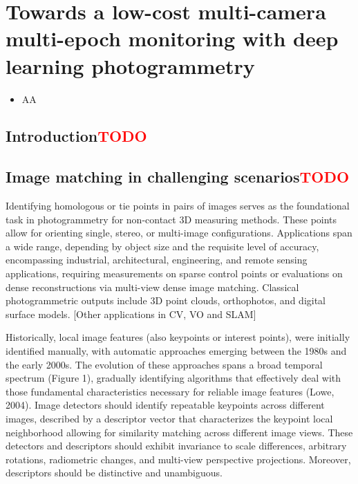\graphicspath{{figures/chapter5/}}
\onehalfspacing

\chapter{Towards a low-cost multi-camera multi-epoch monitoring with deep learning photogrammetry}\label{ch:5}

\vfill


\begin{itemize}
  \item AA
\end{itemize}

\newpage

\section{Introduction\textcolor{red}{TODO}}


\section{Image matching in challenging scenarios\textcolor{red}{TODO}}

Identifying homologous or tie points in pairs of images serves as the foundational task in photogrammetry for non-contact 3D measuring methods. These points allow for orienting single, stereo, or multi-image configurations. Applications span a wide range, depending by object size and the requisite level of accuracy, encompassing industrial, architectural, engineering, and remote sensing applications, requiring measurements on sparse control points or evaluations on dense reconstructions via multi-view dense image matching. Classical photogrammetric outputs include 3D point clouds, orthophotos, and digital surface models. [Other applications in CV, VO and SLAM] 

Historically, local image features (also keypoints or interest points), were initially identified manually, with automatic approaches emerging between the 1980s and the early 2000s. The evolution of these approaches spans a broad temporal spectrum (Figure 1), gradually identifying algorithms that effectively deal with those fundamental characteristics necessary for reliable image features (Lowe, 2004). Image detectors should identify repeatable keypoints across different images, described by a descriptor vector that characterizes the keypoint local neighborhood allowing for similarity matching across different image views. These detectors and descriptors should exhibit invariance to scale differences, arbitrary rotations, radiometric changes, and multi-view perspective projections. Moreover, descriptors should be distinctive and unambiguous.  


